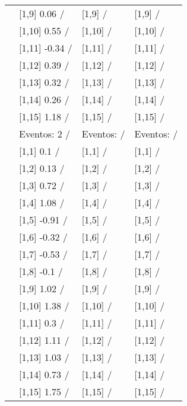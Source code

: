 \begin{table}
\begin{tabular}[t]{llll}
\addlinespace
 & {}[1,9] 0.06  / & {}[1,9]  / & {}[1,9]  /\\
 & {}[1,10] 0.55  / & {}[1,10]  / & {}[1,10]  /\\
 & {}[1,11] -0.34  / & {}[1,11]  / & {}[1,11]  /\\
 & {}[1,12] 0.39  / & {}[1,12]  / & {}[1,12]  /\\
 & {}[1,13] 0.32  / & {}[1,13]  / & {}[1,13]  /\\
\addlinespace
 & {}[1,14] 0.26  / & {}[1,14]  / & {}[1,14]  /\\
 & {}[1,15] 1.18  / & {}[1,15]  / & {}[1,15]  /\\
 & Eventos:  2 / & Eventos:   / & Eventos:   /\\
 & {}[1,1] 0.1  / & {}[1,1]  / & {}[1,1]  /\\
 & {}[1,2] 0.13  / & {}[1,2]  / & {}[1,2]  /\\
\addlinespace
 & {}[1,3] 0.72  / & {}[1,3]  / & {}[1,3]  /\\
 & {}[1,4] 1.08  / & {}[1,4]  / & {}[1,4]  /\\
 & {}[1,5] -0.91  / & {}[1,5]  / & {}[1,5]  /\\
 & {}[1,6] -0.32  / & {}[1,6]  / & {}[1,6]  /\\
 & {}[1,7] -0.53  / & {}[1,7]  / & {}[1,7]  /\\
\addlinespace
500 & {}[1,8] -0.1  / & {}[1,8]  / & {}[1,8]  /\\
 & {}[1,9] 1.02  / & {}[1,9]  / & {}[1,9]  /\\
 & {}[1,10] 1.38  / & {}[1,10]  / & {}[1,10]  /\\
 & {}[1,11] 0.3  / & {}[1,11]  / & {}[1,11]  /\\
 & {}[1,12] 1.11  / & {}[1,12]  / & {}[1,12]  /\\
\addlinespace
 & {}[1,13] 1.03  / & {}[1,13]  / & {}[1,13]  /\\
 & {}[1,14] 0.73  / & {}[1,14]  / & {}[1,14]  /\\
 & {}[1,15] 1.75  / & {}[1,15]  / & {}[1,15]  /\\
\bottomrule
\end{tabular}
\end{table}
